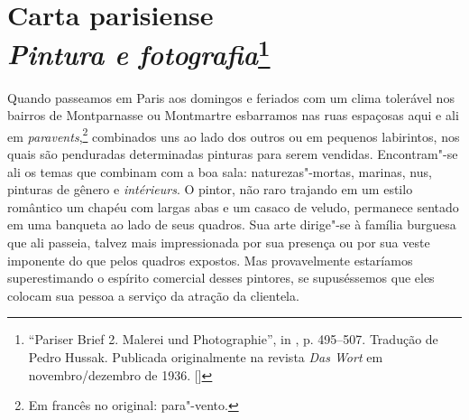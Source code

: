 \chapter{Carta parisiense \\
\emph{Pintura e fotografia}\footnote[*]{``Pariser Brief 2. Malerei und Photographie'', in
  , p. 495--507. Tradução de Pedro Hussak. Publicada originalmente na revista \emph{Das Wort} em novembro/dezembro de 1936. []}}


Quando passeamos em Paris aos domingos e feriados com um clima tolerável
nos bairros de Montparnasse ou Montmartre esbarramos nas ruas espaçosas
aqui e ali em \emph{paravents},\footnote{Em francês no original:
 para"-vento. \versal{[N.~T.]}} combinados uns ao lado dos outros ou em pequenos
labirintos, nos quais são penduradas determinadas pinturas para serem
vendidas. Encontram"-se ali os temas que combinam com a boa sala:
naturezas"-mortas, marinas, nus, pinturas de gênero e \emph{intérieurs}.
O pintor, não raro trajando em um estilo romântico um chapéu com largas abas e
um casaco de veludo, permanece sentado em uma banqueta ao lado de seus
quadros. Sua arte dirige"-se à família burguesa que ali passeia,
talvez mais impressionada por sua presença ou por sua veste
imponente do que pelos quadros expostos. Mas provavelmente estaríamos
superestimando o espírito comercial desses pintores, se supuséssemos que
eles colocam sua pessoa a serviço da atração da clientela.

